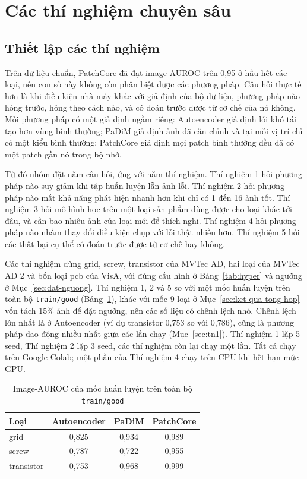\section{Các thí nghiệm chuyên sâu}
\label{sec:tn}

\subsection{Thiết lập các thí nghiệm}
\label{sec:tn-thiet-lap}

Trên dữ liệu chuẩn, PatchCore đã đạt image-AUROC trên 0,95 ở hầu hết các loại, nên con số này không còn phân biệt
được các phương pháp. Câu hỏi thực tế hơn là khi điều kiện nhà máy khác với giả định của bộ dữ liệu, phương pháp nào
hỏng trước, hỏng theo cách nào, và có đoán trước được từ cơ chế của nó không. Mỗi phương pháp có một giả định ngầm
riêng: Autoencoder giả định lỗi khó tái tạo hơn vùng bình thường; PaDiM giả định ảnh đã căn chỉnh và tại mỗi vị trí
chỉ có một kiểu bình thường; PatchCore giả định mọi patch bình thường đều đã có một patch gần nó trong bộ nhớ.

Từ đó nhóm đặt năm câu hỏi, ứng với năm thí nghiệm. Thí nghiệm 1 hỏi phương pháp nào suy giảm khi tập huấn luyện lẫn
ảnh lỗi. Thí nghiệm 2 hỏi phương pháp nào mất khả năng phát hiện nhanh hơn khi chỉ có 1 đến 16 ảnh tốt. Thí nghiệm 3
hỏi mô hình học trên một loại sản phẩm dùng được cho loại khác tới đâu, và cần bao nhiêu ảnh của loại mới để thích
nghi. Thí nghiệm 4 hỏi phương pháp nào nhầm thay đổi điều kiện chụp với lỗi thật nhiều hơn. Thí nghiệm 5 hỏi các thất
bại cụ thể có đoán trước được từ cơ chế hay không.

Các thí nghiệm dùng grid, screw, transistor của MVTec AD, hai loại của MVTec AD 2 và bốn loại pcb của VisA, với đúng
cấu hình ở Bảng~\ref{tab:hyper} và ngưỡng ở Mục~\ref{sec:dat-nguong}. Thí nghiệm 1, 2 và 5 so với một mốc huấn luyện
trên toàn bộ \texttt{train/good} (Bảng~\ref{tab:tn-moc}), khác với mốc 9 loại ở Mục~\ref{sec:ket-qua-tong-hop} vốn tách
15\% ảnh để đặt ngưỡng, nên các số liệu có chênh lệch nhỏ. Chênh lệch lớn nhất là ở Autoencoder (ví dụ transistor 0,753
so với 0,786), cũng là phương pháp dao động nhiều nhất giữa các lần chạy (Mục~\ref{sec:tn1}). Thí nghiệm 1 lặp 5 seed,
Thí nghiệm 2 lặp 3 seed, các thí nghiệm còn lại chạy một lần. Tất cả chạy trên Google Colab; một phần của Thí nghiệm 4
chạy trên CPU khi hết hạn mức GPU.

\begin{table}[htbp]
  \centering
  \caption{Image-AUROC của mốc huấn luyện trên toàn bộ \texttt{train/good}}
  \label{tab:tn-moc}
  \begin{tabular}{@{}lccc@{}}
    \toprule
    Loại & Autoencoder & PaDiM & PatchCore \\
    \midrule
    grid       & 0,825 & 0,934 & 0,989 \\
    screw      & 0,787 & 0,722 & 0,955 \\
    transistor & 0,753 & 0,968 & 0,999 \\
    \bottomrule
  \end{tabular}
\end{table}

